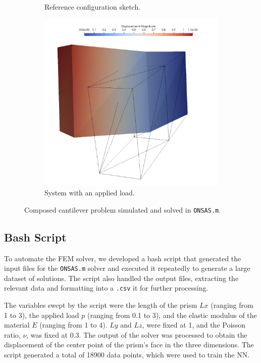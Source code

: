 \documentclass[oneside,a4paper,english,links]{amca}
\begin{document}
\begin{figure}[ht]
	\centering
	\begin{subfigure}[b]{0.48\textwidth}
	\def\svgwidth{\textwidth}
	
	\caption{Reference configuration sketch.}
	\label{fig:ex1_ilus}
	\end{subfigure}
	\hfill
	\begin{subfigure}[b]{0.48\textwidth}
	\centering
	\includegraphics[width=\textwidth]{Figures/Ejemplo2.png}
	\caption{System with an applied load.}
	\end{subfigure}
	\caption{Composed cantilever problem simulated and solved in \texttt{ONSAS.m}.}
	\label{fig:composed_cantilever_model}
\end{figure}


\subsection{Bash Script}
To automate the FEM solver, we developed a bash script that generated the input files for the \texttt{ONSAS.m} \citep{ONSAS} solver and executed it repeatedly to generate a large dataset of solutions. The script also handled the output files, extracting the relevant data and formatting into a \texttt{.csv} it for further processing.

The variables swept by the script were the length of the prism $Lx$ (ranging from 1 to 3), the applied load $p$ (ranging from 0.1 to 3), and the elastic modulus of the material $E$ (ranging from 1 to 4). $Ly$ and $Lz$, were fixed at 1, and the Poisson ratio, $\nu$, was fixed at 0.3. The output of the solver was processed to obtain the displacement of the center point of the prism's face in the three dimensions.  The script generated a total of 18900 data points, which were used to train the NN.
\end{document}
